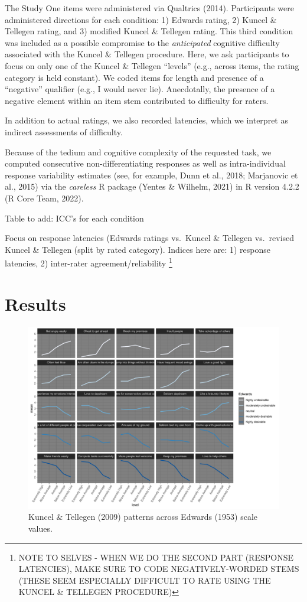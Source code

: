 \documentclass[
  ,jou]{apa6}
\begin{document}
The Study One items were administered via Qualtrics (2014). Participants were administered directions for each condition: 1) Edwards rating, 2) Kuncel \& Tellegen rating, and 3) modified Kuncel \& Tellegen rating. This third condition was included as a possible compromise to the \emph{anticipated} cognitive difficulty associated with the Kuncel \& Tellegen procedure. Here, we ask participants to focus on only one of the Kuncel \& Tellegen ``levels'' (e.g., across items, the rating category is held constant). We coded items for length and presence of a ``negative'' qualifier (e.g., I would never lie). Anecdotally, the presence of a negative element within an item stem contributed to difficulty for raters.

In addition to actual ratings, we also recorded latencies, which we interpret as indirect assessments of difficulty.

Because of the tedium and cognitive complexity of the requested task, we computed consecutive non-differentiating responses as well as intra-individual response variability estimates (see, for example, Dunn et al., 2018; Marjanovic et al., 2015) via the \emph{careless} R package (Yentes \& Wilhelm, 2021) in R version 4.2.2 (R Core Team, 2022).

Table to add: ICC's for each condition

Focus on response latencies (Edwards ratings vs.~Kuncel \& Tellegen vs.~revised Kuncel \& Tellegen (split by rated category). Indices here are: 1) response latencies, 2) inter-rater agreement/reliability \footnote{NOTE TO SELVES - WHEN WE DO THE SECOND PART (RESPONSE LATENCIES), MAKE SURE TO CODE NEGATIVELY-WORDED STEMS (THESE SEEM ESPECIALLY DIFFICULT TO RATE USING THE KUNCEL \& TELLEGEN PROCEDURE)}

\hypertarget{results-1}{%
\section{Results}\label{results-1}}

\begin{figure}
\centering
\includegraphics{KuncelTellegen_files/figure-latex/Figure2-1.pdf}
\caption{\label{fig:Figure2}Kuncel \& Tellegen (2009) patterns across Edwards (1953) scale values.}
\end{figure}
\end{document}

